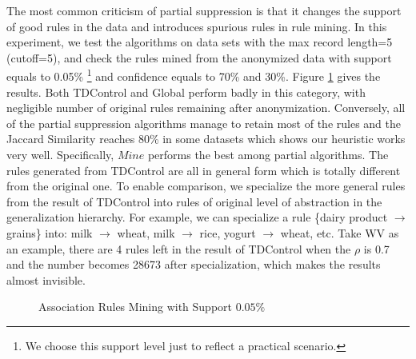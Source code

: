 The most common criticism of partial suppression is that it
changes the support of good rules in the data and introduces spurious
rules in rule mining. In this experiment, we test the algorithms on
data sets with the max record length=5 (cutoff=5),
and check the rules mined from the anonymized data
with support equals to 0.05\% \footnote{We choose this support level just to
reflect a practical scenario.} and confidence equals to 70\% and 30\%.
Figure \ref{fig:rulemining} gives the results.
Both TDControl and Global perform badly in this category, with
negligible number of original rules remaining after anonymization.
Conversely, all of the partial
suppression algorithms manage to retain most of the rules and the Jaccard Similarity reaches 80\% in some datasets which shows
our heuristic works very well. 
Specifically, $Mine$ performs the best among partial algorithms. 
The rules generated from TDControl are all in general form which is
totally different from the original one. To enable comparison,
we specialize the more general rules from the result of TDControl
into rules of original level of abstraction in the generalization hierarchy.
For example, we can specialize a rule \{dairy product $\rightarrow$ grains\}
into:
\rm{milk} $\rightarrow$ \rm{wheat}, 
\rm{milk} $\rightarrow$ \rm{rice}, 
\rm{yogurt} $\rightarrow$ \rm{wheat}, etc. 
Take WV as an example, there are 4 rules left in the result of TDControl when
the $\rho$ is 0.7 and the number becomes 28673 after specialization, which makes
the results almost invisible.

\begin{figure}[tb]
\centering
{}
 \caption{Association Rules Mining with Support $0.05 \%$}
 \label{fig:rulemining}
\end{figure}

